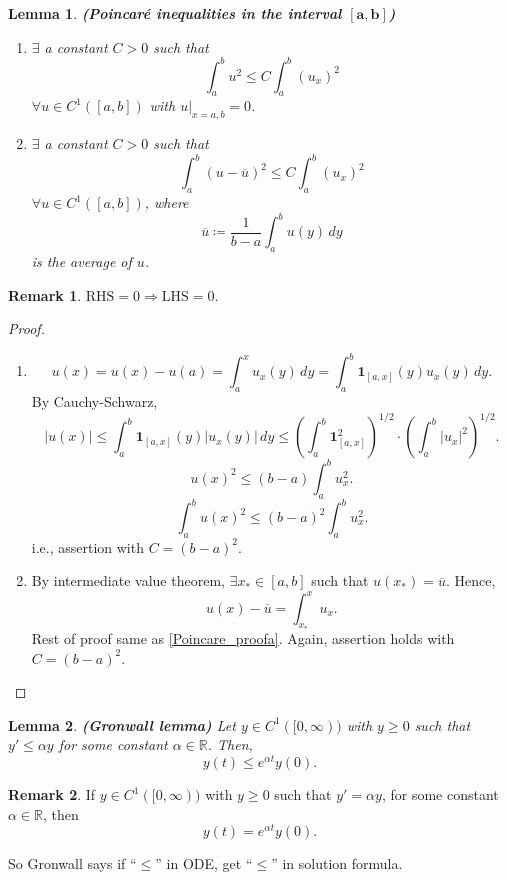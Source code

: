 \documentclass[12pt]{article}
\newtheorem{lemma}{Lemma}[section]
\theoremstyle{definition}
\newtheorem*{remark}{Remark}
\begin{document}
\begin{lemma}
\emph{\textbf{(Poincar\'{e} inequalities in the interval $\boldsymbol{[a,b]}$)}}
\begin{enumerate}[label=\alph*)]
\item $\exists$ a constant $C>0$ such that
\[\int_a^bu^2\leq C\int_a^b(u_x)^2\]
$\forall u\in C^1([a,b])$ with $u|_{x=a,b}=0$.

\item $\exists$ a constant $C>0$ such that
\[\int_a^b(u-\overline{u})^2\leq C\int_a^b(u_x)^2\]
$\forall u\in C^1([a,b])$, where
\[\overline{u}\coloneqq\frac{1}{b-a}\int_a^bu(y)\,dy\]
is the average of $u$.
\end{enumerate}
\end{lemma}

\begin{remark}
$\text{RHS}=0\Rightarrow\text{LHS}=0$.
\end{remark}

\begin{proof}
\begin{enumerate}[label=\alph*)]
\item\label{Poincare_proofa}
\[u(x)=u(x)-u(a)=\int_a^xu_x(y)\,dy=\int_a^b\boldsymbol{1}_{[a,x]}(y)u_x(y)\,dy.\]
By Cauchy-Schwarz,
\[|u(x)|\leq\int_a^b\boldsymbol{1}_{[a,x]}(y)|u_x(y)|\,dy\leq\left(\int_a^b\boldsymbol{1}_{[a,x]}^2\right)^{1/2}\cdot\left(\int_a^b|u_x|^2\right)^{1/2}.\]
\[u(x)^2\leq(b-a)\int_a^bu_x^2.\]
\[\int_a^bu(x)^2\leq(b-a)^2\int_a^bu_x^2.\]
i.e., assertion with $C=(b-a)^2$.

\item By intermediate value theorem, $\exists x_*\in[a,b]$ such that $u(x_*)=\overline{u}$. Hence,
\[u(x)-\overline{u}=\int_{x_*}^xu_x.\]
Rest of proof same as \ref{Poincare_proofa}. Again, assertion holds with $C=(b-a)^2$.
\end{enumerate}
\end{proof}

\begin{lemma}
\emph{\textbf{(Gronwall lemma)}} Let $y\in C^1([0,\infty))$ with $y\geq0$ such that $y'\leq\alpha y$ for some constant $\alpha\in\mathbb{R}$. Then,
\[y(t)\leq e^{\alpha t}y(0).\]
\end{lemma}

\begin{remark}
If $y\in C^1([0,\infty))$ with $y\geq0$ such that $y'=\alpha y$, for some constant $\alpha\in\mathbb{R}$, then
\[y(t)=e^{\alpha t}y(0).\]

So Gronwall says if ``$\leq$'' in ODE, get ``$\leq$'' in solution formula.
\end{remark}
\end{document}
